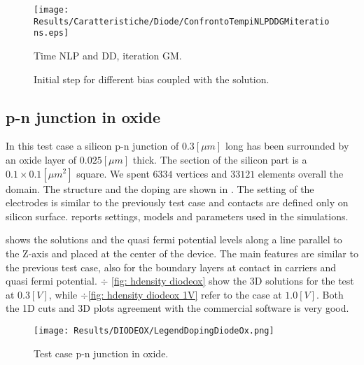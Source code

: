  
 \begin{figure}[!t]
\centering
\texttt{[image: Results/Caratteristiche/Diode/ConfrontoTempiNLPDDGMiterations.eps]}
\caption{Time NLP and DD, iteration GM.}
\label{fig: tempi computazionali 2}
\end{figure}

\begin{figure}[!b]
\centering
{}
\caption{Initial step for different bias coupled with the solution.}
\label{fig: different biast initial step}
\end{figure}
 



\clearpage


\subsection{p-n junction in oxide}
\label{sec: PNOX}

In this test case a silicon p-n junction of $0.3[\mu m]$ long has been surrounded by an oxide layer of $0.025[\mu m]$ thick. The section of the silicon part is a $0.1 \times 0.1 [\mu m^2]$ square.  We spent $6334$ vertices and $33121$ elements overall the domain. The structure and the doping are shown in . The setting of the electrodes is similar to the previously test case and contacts are defined only on silicon surface. 
 reports settings, models and parameters used in the simulations.

 shows the solutions and the quasi fermi potential levels along a line parallel to the Z-axis and placed at the center of the device. The main features are similar to the previous test case, also for the boundary layers at contact in carriers and quasi fermi potential.
 $\div$ \ref{fig: hdensity diodeox} show the 3D solutions for the test at $0.3[V]$, while $\div$\ref{fig: hdensity diodeox 1V} refer to the case at $1.0[V]$. Both the 1D cuts and 3D plots agreement with the commercial software is very good. 

\vspace{0.5cm}

\begin{figure}[!h]
\centering
{}
\hspace{0.06\textwidth}
\hspace{0.04\textwidth}
{\texttt{[image: Results/DIODEOX/LegendDopingDiodeOx.png]}}
\caption{Test case p-n junction in oxide.}
\label{fig: structure diodeox}
\end{figure}


